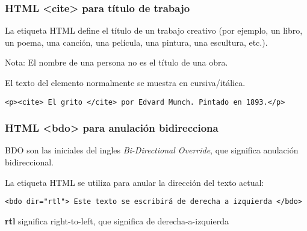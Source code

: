 \begin{frame}[fragile]
  \frametitle{HTML <cite> para título de trabajo}

  La etiqueta HTML  define el título de un trabajo
  creativo (por ejemplo, un libro, un poema, una canción,
  una película, una pintura, una escultura, etc.).

  \begin{exampleblock}{Nota:}
    El nombre de una persona no es el título de una obra.
  \end{exampleblock}

  \vspace{\baselineskip}
  El texto del elemento  normalmente se muestra en
  cursiva/itálica.

  \vspace{\baselineskip}
  \begin{lstlisting}
<p><cite> El grito </cite> por Edvard Munch. Pintado en 1893.</p>
  \end{lstlisting}
\end{frame}

\begin{frame}[fragile]
  \frametitle{HTML <bdo> para anulación bidirecciona}

  BDO son las iniciales del ingles \emph{Bi-Directional Override},
  que significa anulación bidireccional.

  \vspace{\baselineskip}
  La etiqueta HTML  se utiliza para anular la
  dirección del texto actual:

  \vspace{\baselineskip}
  \begin{lstlisting}
<bdo dir="rtl"> Este texto se escribirá de derecha a izquierda </bdo>
  \end{lstlisting}

  \vspace{\baselineskip}
  \textbf{rtl} significa right-to-left, que significa de derecha-a-izquierda

\end{frame}

